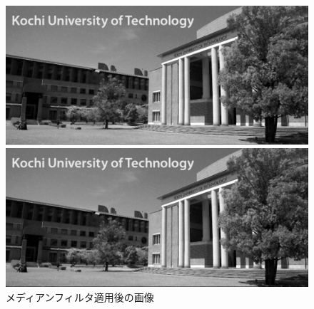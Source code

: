 \begin{figure}[H]
\begin{minipage}[b]{.49\textwidth}
\begin{minipage}[b]{.49\textwidth}
            \includegraphics[keepaspectratio,width=\textwidth]{../../Figures/06_23_mf_img_wgn.png}
            \subcaption{\wgnimg}
        \end{minipage}
        \begin{minipage}[b]{.49\textwidth}
            \includegraphics[keepaspectratio,width=\textwidth]{../../Figures/06_24_mf_img_in.png}
            \subcaption{\inimg}
        \end{minipage}
        \caption{メディアンフィルタ適用後の画像}
    \end{minipage}
\end{figure}
